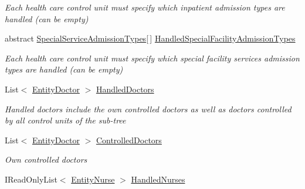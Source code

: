 \begin{DoxyCompactItemize}
\begin{DoxyCompactList}\small\item\em Each health care control unit must specify which inpatient admission types are handled (can be empty) \end{DoxyCompactList}\item 
abstract \hyperlink{class_general_health_care_elements_1_1_treatment_admission_types_1_1_special_service_admission_types}{Special\+Service\+Admission\+Types}\mbox{[}$\,$\mbox{]} \hyperlink{class_general_health_care_elements_1_1_control_units_1_1_control_unit_health_care_ac70972f7088a6e74c5e9e402036f44f6}{Handled\+Special\+Facility\+Admission\+Types}
\begin{DoxyCompactList}\small\item\em Each health care control unit must specify which special facility services admission types are handled (can be empty) \end{DoxyCompactList}\item 
List$<$ \hyperlink{class_general_health_care_elements_1_1_entities_1_1_entity_doctor}{Entity\+Doctor} $>$ \hyperlink{class_general_health_care_elements_1_1_control_units_1_1_control_unit_health_care_a938ec449dbb023a476e59580f1470a94}{Handled\+Doctors}
\begin{DoxyCompactList}\small\item\em Handled doctors include the own controlled doctors as well as doctors controlled by all control units of the sub-\/tree \end{DoxyCompactList}\item 
List$<$ \hyperlink{class_general_health_care_elements_1_1_entities_1_1_entity_doctor}{Entity\+Doctor} $>$ \hyperlink{class_general_health_care_elements_1_1_control_units_1_1_control_unit_health_care_a208db473b7db67e65ce539f91e742cd4}{Controlled\+Doctors}
\begin{DoxyCompactList}\small\item\em Own controlled doctors \end{DoxyCompactList}\item 
I\+Read\+Only\+List$<$ \hyperlink{class_general_health_care_elements_1_1_entities_1_1_entity_nurse}{Entity\+Nurse} $>$ \hyperlink{class_general_health_care_elements_1_1_control_units_1_1_control_unit_health_care_af2469a461a73ab21a9a3a7aa5472a9ee}{Handled\+Nurses}

\end{DoxyCompactItemize}
